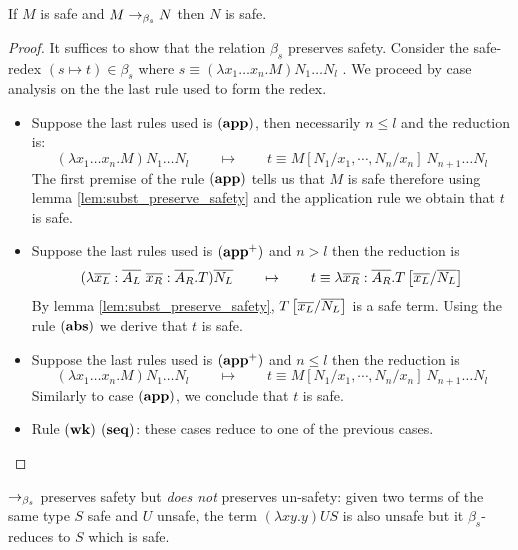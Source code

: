 \begin{lem}
\label{lem:homoh_safered_preserve_safety}
If $M$ is safe and $M \rightarrow_{\beta_s} N$ then $N$ is safe.
\end{lem}

\begin{proof}
It suffices to show that the relation $\beta_s$ preserves safety.
Consider the safe-redex $(s\mapsto t) \in \beta_s$ where $ s \equiv (\lambda x_1 \ldots x_n . M) N_1 \ldots N_l $ .
We proceed by case analysis on the the last rule used to form the redex.
\begin{itemize}
\item Suppose the last rules used is $\mathbf{(app)}$, then necessarily $n\leq l$ and the reduction is:
$$(\lambda x_1 \ldots x_n . M) N_1 \ldots N_l \qquad \mapsto  \qquad t \equiv M[N_1 / x_1 , \cdots, N_n / x_n]\ N_{n+1} \ldots N_l$$
The first premise of the rule $\mathbf{(app)}$ tells us that $M$ is safe therefore using lemma \ref{lem:subst_preserve_safety} and
the application rule we obtain that $t$ is safe.

\item Suppose the last rules used is $\mathbf{(app^+)}$ and $n> l$ then the reduction is
$$ (\lambda \overline{x_L} : \overline{A_L} \
\overline{x_R}: \overline{A_R} . T) \overline{N_L} \qquad \mapsto
\qquad t \equiv \lambda \overline{x_R}: \overline{A_R} .
T\left[ \overline{x_L}/\overline{N_L} \right]
$$
By lemma \ref{lem:subst_preserve_safety}, $T\left[ \overline{x_L}/\overline{N_L} \right]$ is a safe term.
Using the rule $\mathbf{(abs)}$ we derive that $t$ is safe.

\item Suppose the last rules used is $\mathbf{(app^+)}$ and $n\leq l$ then the reduction is
$$(\lambda x_1 \ldots x_n . M) N_1 \ldots N_l \qquad \mapsto \qquad t \equiv M[N_1 / x_1 , \cdots, N_n / x_n]\ N_{n+1} \ldots N_l$$
Similarly to case $\mathbf{(app)}$, we conclude that $t$ is safe.

\item Rule $\mathbf{(wk)}$ $\mathbf{(seq)}$: these cases reduce to one of the previous cases.
\end{itemize}
\end{proof}


\begin{rem}
\label{rem:betasred_notpreserv_unsafety} $\rightarrow_{\beta_s}$ preserves
safety but \emph{does not} preserves un-safety: given two terms of
the same type $S$ safe and $U$ unsafe, the term $(\lambda x y . y) U S$ is also unsafe
but it $\beta_s$-reduces to $S$ which is safe.
\end{rem}


